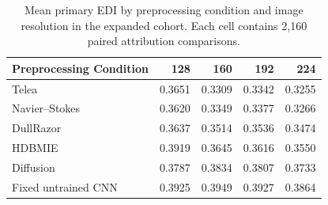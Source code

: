 \begin{table}[H]
\centering
\caption{Mean primary EDI by preprocessing condition and image resolution in the expanded cohort. Each cell contains 2,160 paired attribution comparisons.}
\label{tab:appB_resolution_edi_summary}
\small
\begin{tabular}{lrrrr}
\toprule
Preprocessing Condition
& 128
& 160
& 192
& 224 \\
\midrule
Telea & 0.3651 & 0.3309 & 0.3342 & 0.3255 \\
Navier--Stokes & 0.3620 & 0.3349 & 0.3377 & 0.3266 \\
DullRazor & 0.3637 & 0.3514 & 0.3536 & 0.3474 \\
HDBMIE & 0.3919 & 0.3645 & 0.3616 & 0.3550 \\
Diffusion & 0.3787 & 0.3834 & 0.3807 & 0.3733 \\
Fixed untrained CNN & 0.3925 & 0.3949 & 0.3927 & 0.3864 \\
\bottomrule
\end{tabular}
\end{table}
